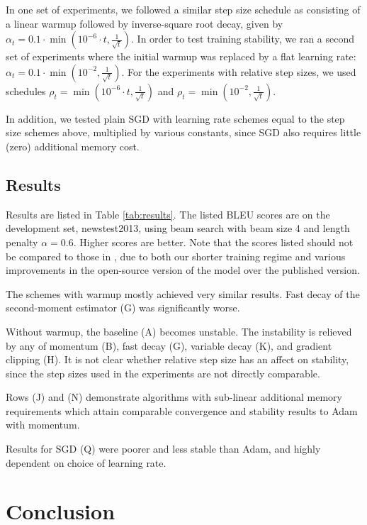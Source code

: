 \documentclass{article}
\begin{document}
In one set of experiments, we followed a similar step size schedule as \citet{Vaswani17Attention} consisting of a linear warmup followed by inverse-square root decay, given by $\alpha_t=0.1\cdot \min(10^{-6}\cdot t, \frac{1}{\sqrt{t}})$.  In order to test training stability, we ran a second set of experiments where the initial warmup was replaced by a flat learning rate: $\alpha_t=0.1\cdot \min(10^{-2}, \frac{1}{\sqrt{t}})$.  For the experiments with relative step sizes, we used schedules $\rho_t=\min(10^{-6}\cdot t, \frac{1}{\sqrt{t}})$ and $\rho_t=\min(10^{-2}, \frac{1}{\sqrt{t}})$.

In addition, we tested plain SGD with learning rate schemes equal to the step size schemes above, multiplied by various constants, since SGD also requires little (zero) additional memory cost.

\subsection{Results}
Results are listed in Table \ref{tab:results}.  The listed BLEU scores are on the development set, newstest2013, using beam search with beam size 4 and length penalty $\alpha=0.6$.  Higher scores are better.  Note that the scores listed should not be compared to those in \citet{Vaswani17Attention}, due to both our shorter training regime and various improvements in the open-source version of the model over the published version.

The schemes with warmup mostly achieved very similar results.  Fast decay of the second-moment estimator (G) was significantly worse.

Without warmup, the baseline (A) becomes unstable.  The instability is relieved by any of momentum (B), fast decay (G), variable decay (K), and gradient clipping (H).   It is not clear whether relative step size has an affect on stability, since the step sizes used in the experiments are not directly comparable. 

Rows (J) and (N) demonstrate algorithms with sub-linear additional memory requirements which attain comparable convergence and stability results to Adam with momentum.

Results for SGD (Q) were poorer and less stable than Adam, and highly dependent on choice of learning rate.

\section{Conclusion}
\end{document}
